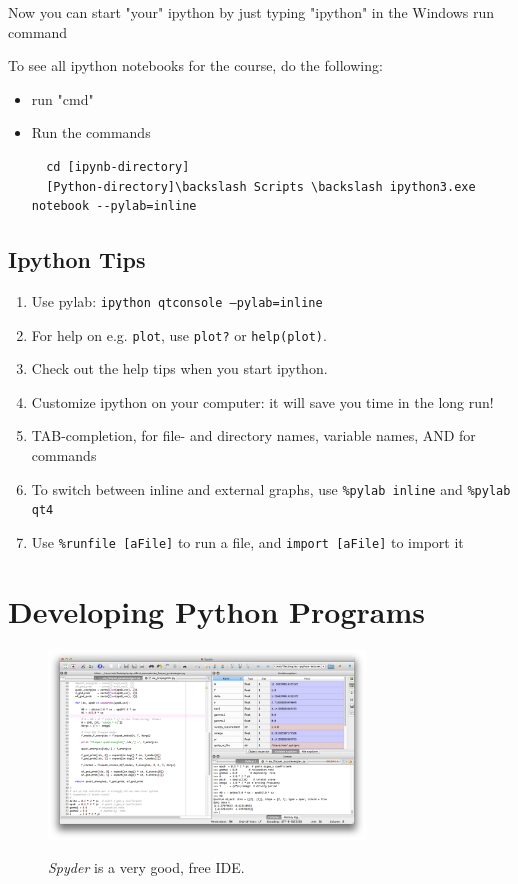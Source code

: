 Now you can start "your" ipython by just typing "ipython" in the Windows run command

To see all ipython notebooks for the course, do the following:
\begin{itemize}
  \item run "cmd"
  \item Run the commands
  \begin{lstlisting}
  cd [ipynb-directory]
  [Python-directory]\backslash Scripts \backslash ipython3.exe notebook --pylab=inline
  \end{lstlisting}
\end{itemize}



\subsection{Ipython Tips}

\begin{enumerate}
    \item Use pylab: \texttt{ipython qtconsole ---pylab=inline}
    \item For help on e.g. \texttt{plot}, use \texttt{plot?} or \texttt{help(plot)}.
    \item Check out the help tips when you start ipython.
    \item Customize ipython on your computer: it will save you time in the long run!
    \item TAB-completion, for file- and directory names, variable names, AND for commands
    \item To switch between inline and external graphs, use \texttt{\%pylab inline} and \texttt{\%pylab qt4}
    \item Use \texttt{\%runfile [aFile]} to run a file, and \texttt{import [aFile]} to import it
\end{enumerate}

\section{Developing Python Programs}

\begin{figure}
  \centering
  \includegraphics[width=0.75\textwidth]{../Images/spyder-screenshot.jpg}\\
  \caption{\emph{Spyder} is a very good, free IDE.}
\end{figure}

